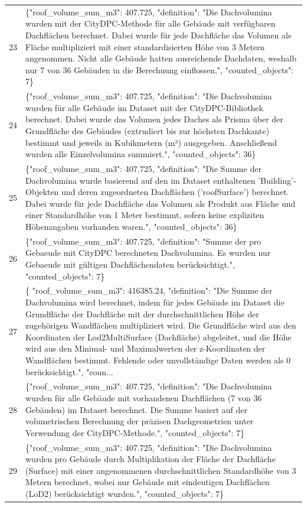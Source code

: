 \documentclass[a4paper,11pt]{article}
\begin{document}
\begin{table}[ht]
\begin{tabular}{r p{12cm}}
23 & \{"roof\_volume\_sum\_m3": 407.725, "definition": "Die Dachvolumina wurden mit der CityDPC-Methode für alle Gebäude mit verfügbaren Dachflächen berechnet. Dabei wurde für jede Dachfläche das Volumen als Fläche multipliziert mit einer standardisierten Höhe von 3 Metern angenommen. Nicht alle Gebäude hatten ausreichende Dachdaten, weshalb nur 7 von 36 Gebäuden in die Berechnung einflossen.", "counted\_objects": 7\} \\
24 & \{"roof\_volume\_sum\_m3": 407.725, "definition": "Die Dachvolumina wurden für alle Gebäude im Dataset mit der CityDPC-Bibliothek berechnet. Dabei wurde das Volumen jedes Daches als Prisma über der Grundfläche des Gebäudes (extrudiert bis zur höchsten Dachkante) bestimmt und jeweils in Kubikmetern (m³) ausgegeben. Anschließend wurden alle Einzelvolumina summiert.", "counted\_objects": 36\} \\
25 & \{"roof\_volume\_sum\_m3": 407.725, "definition": "Die Summe der Dachvolumina wurde basierend auf den im Dataset enthaltenen 'Building'-Objekten und deren zugeordneten Dachflächen ('roofSurface') berechnet. Dabei wurde für jede Dachfläche das Volumen als Produkt aus Fläche und einer Standardhöhe von 1 Meter bestimmt, sofern keine expliziten Höhenangaben vorhanden waren.", "counted\_objects": 36\} \\
26 & \{"roof\_volume\_sum\_m3": 407.725, "definition": "Summe der pro Gebaeude mit CityDPC berechneten Dachvolumina. Es wurden nur Gebaeude mit gültigen Dachflächendaten berücksichtigt.", "counted\_objects": 7\} \\
27 & \{
  "roof\_volume\_sum\_m3": 416385.24,
  "definition": "Die Summe der Dachvolumina wird berechnet, indem für jedes Gebäude im Dataset die Grundfläche der Dachfläche mit der durchschnittlichen Höhe der zugehörigen Wandflächen multipliziert wird. Die Grundfläche wird aus den Koordinaten der Lod2MultiSurface (Dachfläche) abgeleitet, und die Höhe wird aus den Minimal- und Maximalwerten der z-Koordinaten der Wandflächen bestimmt. Fehlende oder unvollständige Daten werden als 0 berücksichtigt.",
  "coun... \\
28 & \{"roof\_volume\_sum\_m3": 407.725, "definition": "Die Dachvolumina wurden für alle Gebäude mit vorhandenen Dachflächen (7 von 36 Gebäuden) im Dataset berechnet. Die Summe basiert auf der volumetrischen Berechnung der präzisen Dachgeometrien unter Verwendung der CityDPC-Methode.", "counted\_objects": 7\} \\
29 & \{"roof\_volume\_sum\_m3": 407.725, "definition": "Die Dachvolumina wurden pro Gebäude durch Multiplikation der Fläche der Dachfläche (Surface) mit einer angenommenen durchschnittlichen Standardhöhe von 3 Metern berechnet, wobei nur Gebäude mit eindeutigen Dachflächen (LoD2) berücksichtigt wurden.", "counted\_objects": 7\} \\

\end{tabular}
\end{table}
\end{document}
